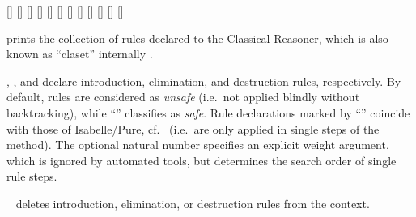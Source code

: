 \begin{isabellebody}
\begin{isamarkuptext}
  \begin{railoutput}
\rail@bar
{}[]
[]
[]
\rail@endbar
\rail@bar
{}[]
[]
\rail@endbar
\rail@bar
{}
[]
\rail@endbar
\rail@end
{}
[]
[]
\rail@end
{}
[]
\rail@bar
\rail@bar
{}
[]
\rail@endbar
\rail@bar
{}
[]
\rail@endbar
{}
[]
\rail@endbar
\rail@end
\end{railoutput}


  \begin{description}

  \item \hyperlink{command.print-claset}{\mbox{}} prints the collection of rules
  declared to the Classical Reasoner, which is also known as
  ``claset'' internally \cite{isabelle-ref}.
  
  \item \hyperlink{attribute.intro}{\mbox{}}, \hyperlink{attribute.elim}{\mbox{}}, and \hyperlink{attribute.dest}{\mbox{}}
  declare introduction, elimination, and destruction rules,
  respectively.  By default, rules are considered as \emph{unsafe}
  (i.e.\ not applied blindly without backtracking), while ``'' classifies as \emph{safe}.  Rule declarations marked by
  ``'' coincide with those of Isabelle/Pure, cf.\
   (i.e.\ are only applied in single steps
  of the \hyperlink{method.rule}{\mbox{\isa{rule}}} method).  The optional natural number
  specifies an explicit weight argument, which is ignored by automated
  tools, but determines the search order of single rule steps.

  \item \hyperlink{attribute.rule}{\mbox{}}~ deletes introduction,
  elimination, or destruction rules from the context.


\end{description}
\end{isamarkuptext}
\end{isabellebody}
